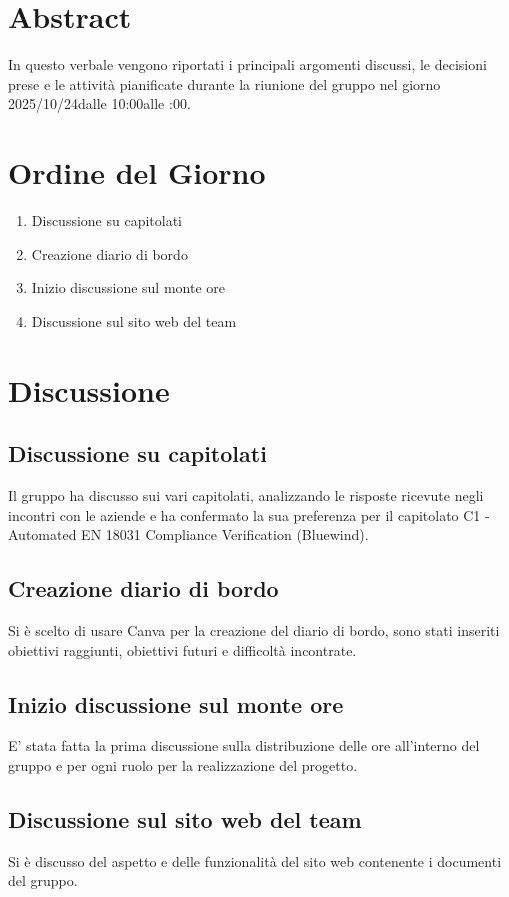 \documentclass[a4paper,12pt]{article}
\newcommand{\DataVerbale}{2025/10/24}
\newcommand{\OraInizio}{10:00}
\newcommand{\OraFine}{12:00}
\newcommand{\AbstractVerbale}{%
In questo verbale vengono riportati i principali argomenti discussi, le decisioni prese e le attività pianificate durante la riunione del gruppo nel giorno \DataVerbale \space dalle \OraInizio \space alle \space \OraFine .
}
\begin{document}
\newpage

\tableofcontents

\newpage
\section{Abstract}{
    \begin{minipage}{0.9\textwidth}
        \small
        \AbstractVerbale
    \end{minipage}
}


\section{Ordine del Giorno}{
    \begin{enumerate}
        \item Discussione su capitolati
        \item Creazione diario di bordo
        \item Inizio discussione sul monte ore
        \item Discussione sul sito web del team
    \end{enumerate}
}

\section{Discussione}{
	\subsection{Discussione su capitolati}{
		Il gruppo ha discusso sui vari capitolati, analizzando le risposte ricevute negli incontri con le aziende e ha confermato la sua preferenza per il capitolato C1 - 		Automated EN 18031 Compliance Verification (Bluewind).
}
	\subsection{Creazione diario di bordo}{
		Si è scelto di usare Canva per la creazione del diario di bordo, sono stati inseriti obiettivi raggiunti, obiettivi futuri e difficoltà incontrate.
}
	\subsection{Inizio discussione sul monte ore}{
		E' stata fatta la prima discussione sulla distribuzione delle ore all'interno del gruppo e per ogni ruolo per la realizzazione del progetto.
}
	\subsection{Discussione sul sito web del team}{
		Si è discusso del aspetto e delle funzionalità del sito web contenente i documenti del gruppo.	
}
}
\end{document}
